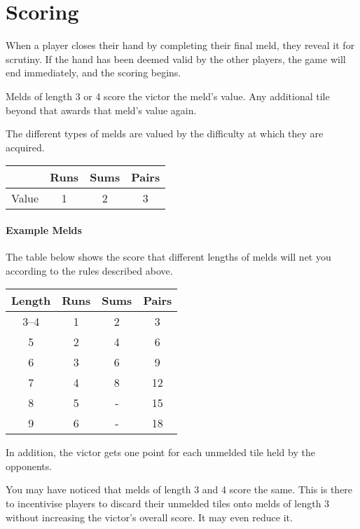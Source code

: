 \section{Scoring}\label{sec:scoring}
When a player closes their hand by completing their final meld, they reveal it for scrutiny. 
If the hand has been deemed valid by the other players, the game will end immediately, and the scoring begins.

Melds of length 3 or 4 score the victor the meld's value. Any additional tile beyond that awards that meld's value again.

The different types of melds are valued by the difficulty at which they are acquired.

\begin{center}
    \begin{tabular}{c||c|c|c}
              & Runs & Sums & Pairs\\\hline\hline
        Value & 1 & 2 & 3\\
    \end{tabular}
\end{center}

\paragraph{Example Melds}
The table below shows the score that different lengths of melds will net you according to the rules described above.
\begin{center}
    \begin{tabular}{c||c|c|c}
        Length & Runs & Sums & Pairs\\\hline\hline
        3--4 & 1 &  2 &  3 \\
           5 & 2 &  4 &  6 \\
           6 & 3 &  6 &  9 \\
           7 & 4 &  8 & 12 \\
           8 & 5 &  - & 15 \\
           9 & 6 &  - & 18 \\
    \end{tabular}
\end{center}
In addition, the victor gets one point for each unmelded tile held by the opponents.

\aside You may have noticed that melds of length 3 and 4 score the same. This is there to incentivise players to discard their unmelded tiles onto melds of length 3 without increasing the victor's overall score. It may even reduce it.

